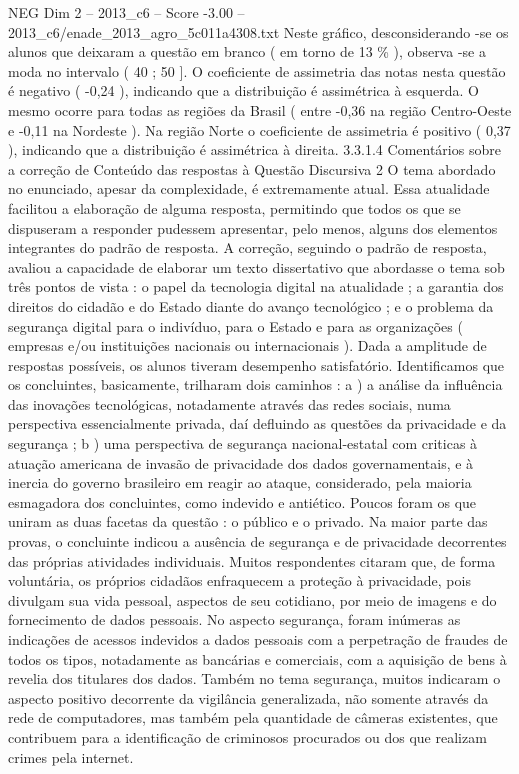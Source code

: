 \begin{textsample}{NEG Dim 2 – 2013\_c6 – Score -3.00 – 2013\_c6/enade\_2013\_agro\_5c011a4308.txt}
Neste gráfico, desconsiderando -se os alunos que deixaram a questão em branco ( em torno de 13 \% ), observa -se a moda no intervalo ( 40 ; 50 ].
O coeficiente de assimetria das notas nesta questão é negativo ( -0,24 ), indicando que a distribuição é assimétrica à esquerda.
O mesmo ocorre para todas as regiões da Brasil ( entre -0,36 na região Centro-Oeste e -0,11 na Nordeste ).
Na região Norte o coeficiente de assimetria é positivo ( 0,37 ), indicando que a distribuição é assimétrica à direita. 3.3.1.4 Comentários sobre a correção de Conteúdo das respostas à Questão Discursiva 2 O tema abordado no enunciado, apesar da complexidade, é extremamente atual.
Essa atualidade facilitou a elaboração de alguma resposta, permitindo que todos os que se dispuseram a responder pudessem apresentar, pelo menos, alguns dos elementos integrantes do padrão de resposta.
A correção, seguindo o padrão de resposta, avaliou a capacidade de elaborar um texto dissertativo que abordasse o tema sob três pontos de vista : o papel da tecnologia digital na atualidade ; a garantia dos direitos do cidadão e do Estado diante do avanço tecnológico ; e o problema da segurança digital para o indivíduo, para o Estado e para as organizações ( empresas e/ou instituições nacionais ou internacionais ).
Dada a amplitude de respostas possíveis, os alunos tiveram desempenho satisfatório.
Identificamos que os concluintes, basicamente, trilharam dois caminhos : a ) a análise da influência das inovações tecnológicas, notadamente através das redes sociais, numa perspectiva essencialmente privada, daí defluindo as questões da privacidade e da segurança ; b ) uma perspectiva de segurança nacional-estatal com criticas à atuação americana de invasão de privacidade dos dados governamentais, e à inercia do governo brasileiro em reagir ao ataque, considerado, pela maioria esmagadora dos concluintes, como indevido e antiético.
Poucos foram os que uniram as duas facetas da questão : o público e o privado.
Na maior parte das provas, o concluinte indicou a ausência de segurança e de privacidade decorrentes das próprias atividades individuais.
Muitos respondentes citaram que, de forma voluntária, os próprios cidadãos enfraquecem a proteção à privacidade, pois divulgam sua vida pessoal, aspectos de seu cotidiano, por meio de imagens e do fornecimento de dados pessoais.
No aspecto segurança, foram inúmeras as indicações de acessos indevidos a dados pessoais com a perpetração de fraudes de todos os tipos, notadamente as bancárias e comerciais, com a aquisição de bens à revelia dos titulares dos dados.
Também no tema segurança, muitos indicaram o aspecto positivo decorrente da vigilância generalizada, não somente através da rede de computadores, mas também pela quantidade de câmeras existentes, que contribuem para a identificação de criminosos procurados ou dos que realizam crimes pela internet.

\end{textsample}
